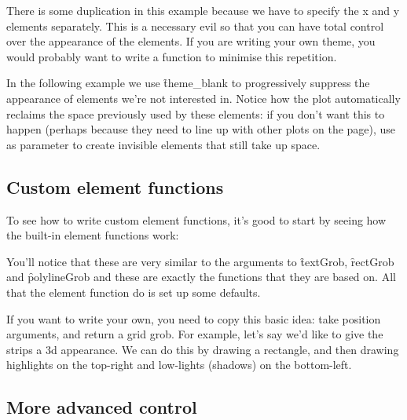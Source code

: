 There is some duplication in this example because we have to specify the x and y elements separately.  This is a necessary evil so that you can have total control over the appearance of the elements.  If you are writing your own theme, you would probably want to write a function to minimise this repetition.

In the following example we use \f{theme_blank} to progressively suppress the appearance of elements we're not interested in.   Notice how the plot automatically reclaims the space previously used by these elements: if you don't want this to happen (perhaps because they need to line up with other plots on the page), use  as parameter to create invisible elements that still take up space.

% 


\subsection{Custom element functions}
\label{sub:custom-elements}

To see how to write custom element functions, it's good to start by seeing how the built-in element functions work:

% 


You'll notice that these are very similar to the arguments to \f{textGrob}, \f{rectGrob} and \f{polylineGrob} and these are exactly the functions that they are based on.  All that the element function do is set up some defaults.  

If you want to write your own, you need to copy this basic idea: take position arguments, and return a grid grob.  For example, let's say we'd like to give the strips a 3d appearance.  We can do this by drawing a rectangle, and then drawing highlights on the top-right and low-lights (shadows) on the bottom-left.


\subsection{More advanced control}
\label{sub:more_advanced_control}

